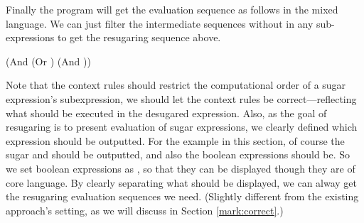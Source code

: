Finally the program  will get the evaluation sequence as follows in the mixed language. We can just filter the intermediate sequences without  in any sub-expressions to get the resugaring sequence above. 


\begin{Codes}
    (And (Or \true \false) (And \false \true))
\OneStep{ \false}
\end{Codes}

Note that the context rules should restrict the computational order of a sugar expression's subexpression, we should let the context rules be correct---reflecting what should be executed in the desugared expression. Also, as the goal of resugaring is to present evaluation of sugar expressions, we clearly defined which expression should be outputted. For the example in this section, of course the sugar  and  should be outputted, and also the boolean expressions should be. So we set boolean expressions as , so that they can be displayed though they are of core language. By clearly separating what should be displayed, we can alway get the resugaring evaluation sequences we need. (Slightly different from the existing approach's setting, as we will discuss in Section \ref{mark:correct}.)